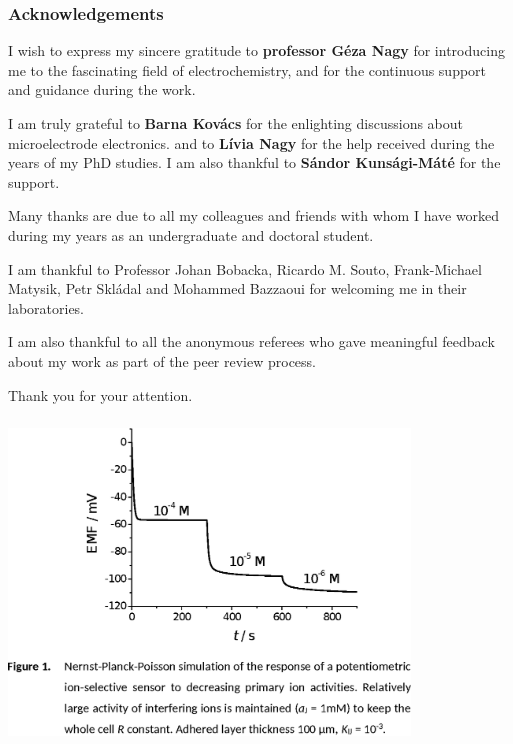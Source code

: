 \documentclass{beamer}
\begin{document}
\begin{frame}
\frametitle{Acknowledgements}
\scriptsize
I wish to express my sincere gratitude to \textbf{professor Géza Nagy} for introducing me to the fascinating field of electrochemistry, and for the continuous support and guidance during the work.

\vspace{5mm}

I am truly grateful to \textbf{Barna Kovács} for the enlighting discussions about microelectrode electronics. and to \textbf{Lívia Nagy} for the help received during the years of my PhD studies. I am also thankful to \textbf{Sándor Kunsági-Máté} for the support.

\vspace{5mm}

Many thanks are due to all my colleagues and friends with whom I have worked during my years as an undergraduate and doctoral student.

\vspace{5mm}

I am thankful to Professor Johan Bobacka, Ricardo M. Souto, Frank-Michael Matysik, Petr Skládal and Mohammed Bazzaoui for welcoming me in their laboratories.

\vspace{5mm}

I am also thankful to all the anonymous referees who gave meaningful feedback about my work as part of the peer review process.
\end{frame}

\begin{frame}
\centering
Thank you for your attention.
\end{frame}


\begin{frame}
	\frametitle{}
	\centering
\includegraphics[width=0.8\textwidth]{HL1.eps}

\end{frame}
\end{document}
